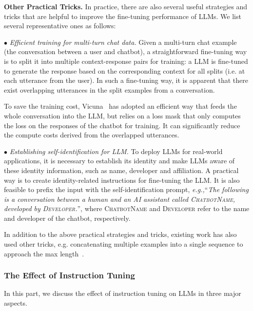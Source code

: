 \textbf{Other Practical Tricks.} {In practice, there are also several useful strategies and tricks that are helpful to improve the fine-tuning performance of LLMs. We  list several  representative ones as follows:}

$\bullet$ \emph{Efficient training for multi-turn chat data.} Given a multi-turn chat example (the conversation between a user and chatbot), a straightforward fine-tuning way is to split it into multiple context-response pairs for training: a LLM is fine-tuned to generate the response based on the corresponding context for all splits (i.e. at each utterance from the user). In such a fine-tuning way, it is apparent that there exist  overlapping utterances in the split examples from a conversation. 

To save the training cost, Vicuna~\cite{vicuna2023} has adopted an efficient way that feeds the whole conversation into the LLM, but relies on a loss mask that only computes the loss on the responses of the chatbot for training. It can significantly reduce the compute costs derived from the overlapped utterances.

$\bullet$ \emph{Establishing self-identification for LLM.} To deploy  LLMs for real-world applications, it is necessary to establish its identity and make LLMs aware of these identity information, such as name, developer and affiliation. A practical  way is to create identity-related instructions for fine-tuning the LLM. It is also feasible to prefix the input with the self-identification prompt, \emph{e.g.,}``\emph{The following is a conversation between a human and an AI assistant called \textsc{ChatbotName}, developed by \textsc{Developer}.}'', where \textsc{ChatbotName} and \textsc{Developer} refer to the name and developer of the chatbot, respectively.

In addition to the above practical strategies and tricks, existing work has also used other tricks, e.g. concatenating multiple examples into a single sequence to approach the max length~\cite{Krell-2021-arxiv-efficient}.

\subsubsection{The Effect of Instruction Tuning}\label{subsec:effectIT}

In this part, we discuss the effect of instruction tuning on LLMs in three major aspects. 

